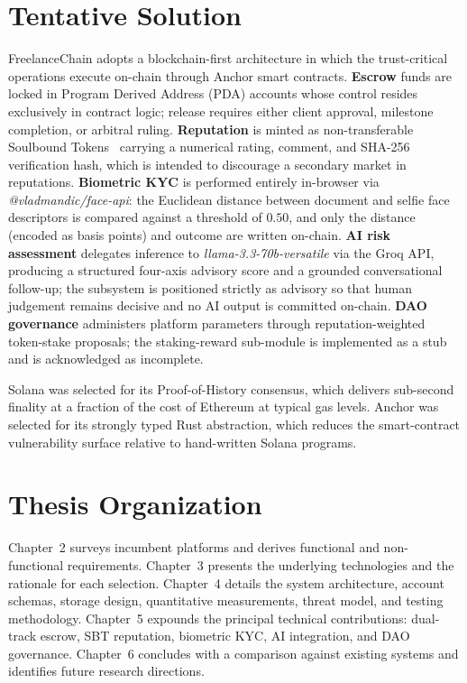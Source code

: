 \section{Tentative Solution}
\label{section:1.3}

FreelanceChain adopts a blockchain-first architecture in which the trust-critical operations execute on-chain through Anchor smart contracts. \textbf{Escrow} funds are locked in Program Derived Address (PDA) accounts whose control resides exclusively in contract logic; release requires either client approval, milestone completion, or arbitral ruling. \textbf{Reputation} is minted as non-transferable Soulbound Tokens~\cite{weyl2022decentralized} carrying a numerical rating, comment, and SHA-256 verification hash, which is intended to discourage a secondary market in reputations. \textbf{Biometric KYC} is performed entirely in-browser via \emph{@vladmandic/face-api}: the Euclidean distance between document and selfie face descriptors is compared against a threshold of $0.50$, and only the distance (encoded as basis points) and outcome are written on-chain. \textbf{AI risk assessment} delegates inference to \emph{llama-3.3-70b-versatile} via the Groq API, producing a structured four-axis advisory score and a grounded conversational follow-up; the subsystem is positioned strictly as advisory so that human judgement remains decisive and no AI output is committed on-chain. \textbf{DAO governance} administers platform parameters through reputation-weighted token-stake proposals; the staking-reward sub-module is implemented as a stub and is acknowledged as incomplete.

Solana was selected for its Proof-of-History consensus, which delivers sub-second finality at a fraction of the cost of Ethereum at typical gas levels. Anchor was selected for its strongly typed Rust abstraction, which reduces the smart-contract vulnerability surface relative to hand-written Solana programs.

\section{Thesis Organization}
\label{section:1.4}

Chapter~2 surveys incumbent platforms and derives functional and non-functional requirements. Chapter~3 presents the underlying technologies and the rationale for each selection. Chapter~4 details the system architecture, account schemas, storage design, quantitative measurements, threat model, and testing methodology. Chapter~5 expounds the principal technical contributions: dual-track escrow, SBT reputation, biometric KYC, AI integration, and DAO governance. Chapter~6 concludes with a comparison against existing systems and identifies future research directions.
